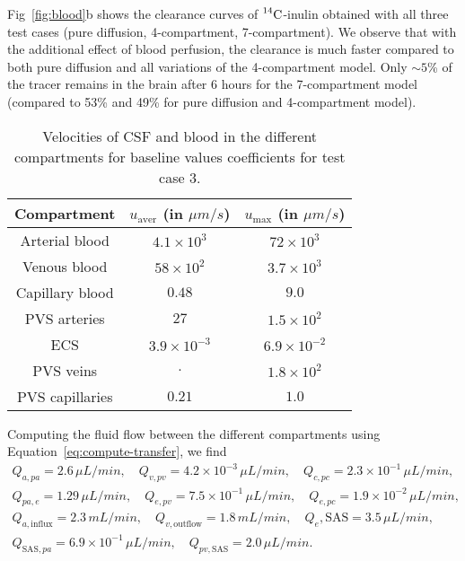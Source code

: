 \documentclass[10pt]{article}
\newcommand{\1}{^{(1)}}
\newcommand{\2}{^{(2)}}
\newcommand{\Cinulin}{$\prescript{14}{}{\text{C}}$-inulin }
\begin{document}
Fig~\ref{fig:blood}b shows the clearance curves of \Cinulin obtained with all three test cases (pure diffusion, 4-compartment, 7-compartment). 
We observe that with the additional effect of blood perfusion, the clearance is much faster compared to both pure diffusion and all variations of the 4-compartment model. Only $\sim 5$\% of the tracer remains in the brain after 6 hours for the 7-compartment model (compared to 53\% and 49\% for pure diffusion and 4-compartment model). 

\begin{table}[h!]
    \centering
    \begin{tabular}{c|c|c}
       Compartment & $u_\text{aver}$ (in $\si{\mu m/s}$) & $u_\text{max}$ (in $\si{\mu m/s}$) \\
       \hline
        Arterial blood & $4.1 \times 10^3$ & $72 \times 10^3$\\
        Venous blood & $58 \times 10^2$ & $3.7 \times 10^3$ \\
        Capillary blood & $0.48$ & $9.0$\\
        PVS arteries & $27$ & $1.5 \times 10^2$ \\
        ECS &  $3.9 \times 10^{-3}$ & $ 6.9  \times 10^{-2} $ \\
        PVS veins & $.$ & $1.8\times 10^2$ \\
        PVS capillaries & $0.21$ & $1.0$
    \end{tabular}
    \caption{Velocities of CSF and blood in the different compartments for baseline values coefficients for test case 3.}
    \label{tab:velocities-withblood}
\end{table}

Computing the fluid flow between the different compartments using Equation~\eqref{eq:compute-transfer}, we find 
\[
\begin{aligned}
    Q_{a,pa} = 2.6 \, \si{\mu L/min},\quad Q_{v,pv} = 4.2 \times 10^{-3} \, \si{\mu L/min},\quad Q_{c,pc} = 2.3\times 10^{-1}  \, \si{\mu L/min}, \\
    Q_{pa,e} = 1.29 \, \si{\mu L/min},\quad Q_{e,pv} = 7.5 \times 10^{-1}  \,\si{\mu L/min},\quad Q_{e,pc} = 1.9 \times 10^{-2} \, \si{\mu L/min}, \\
    Q_{a,\text{influx}} = 2.3 \, \si{mL/min} , \quad Q_{v,\text{outflow}  } = 1.8 \, \si{mL/min},\quad Q_{e},\text{SAS} = 3.5 \, \si{\mu L/min},\\
    Q_{\text{SAS},pa} = 6.9 \times 10^{-1}\,  \si{\mu L/min},\quad Q_{pv,\text{SAS}} = 2.0 \, \si{\mu L/min}.
\end{aligned}
\]
\end{document}
